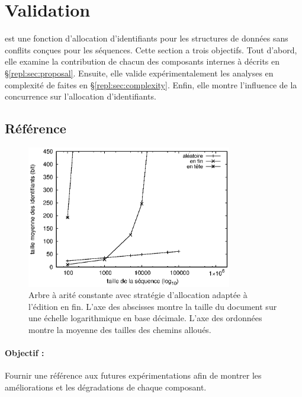 
\section{Validation}
\label{repl:sec:validation}

\LSEQ est une fonction d'allocation d'identifiants pour les structures de
données sans conflits conçues pour les séquences.  Cette section a trois
objectifs. Tout d'abord, elle examine la contribution de chacun des composants
internes à \LSEQ décrits en §\ref{repl:sec:proposal}.  Ensuite, elle valide
expérimentalement les analyses en complexité de \LSEQ faites en
§\ref{repl:sec:complexity}.  Enfin, elle montre l'influence de la concurrence
sur l'allocation d'identifiants.


\subsection{Référence}

\begin{figure}
  \begin{center}
    \includegraphics[width=0.8\textwidth]{img/lseq/logoot.eps}
    \caption[Mesures de référence de la taille des chemins]
    {\label{repl:img:logoot} Arbre à arité constante avec stratégie d'allocation
      adaptée à l'édition en fin. L'axe des abscisses montre la taille du
      document sur une échelle logarithmique en base décimale. L'axe des
      ordonnées montre la moyenne des tailles des chemins alloués.}
  \end{center}
\end{figure}


\paragraph{Objectif :} Fournir une référence aux futures expérimentations afin
de montrer les améliorations et les dégradations de chaque composant.

